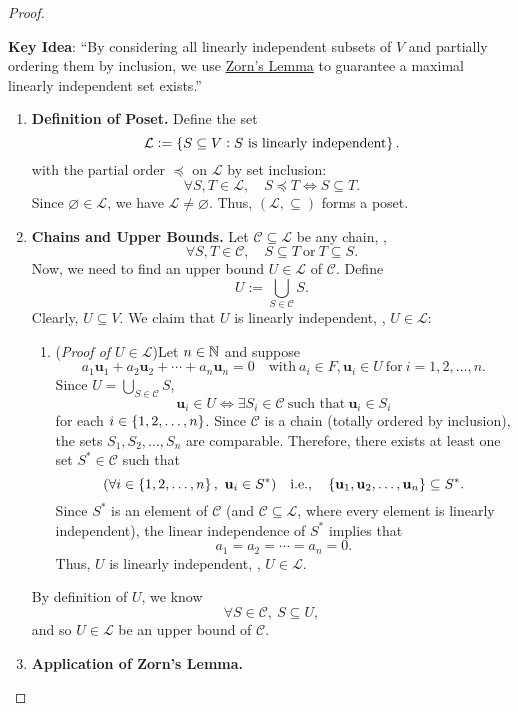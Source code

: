 \documentclass[11pt,openany]{article}
\renewcommand{\vec}[1]{\mathbf{#1}}
\begin{document}
\newpage
{}
\begin{proof}
	\ \begin{flushleft}\color{red}
		\textbf{Key Idea}: ``By considering all linearly independent subsets of \(V\) and partially ordering them by inclusion, we use \underline{Zorn's Lemma} to guarantee a maximal linearly independent set exists.''
	\end{flushleft}
		\begin{enumerate}[Step 1]
				\item \textbf{Definition of Poset.}
				Define the set \[
				\mathcal{L}:=\set{S\subseteq V:\text{$S$ is linearly independent}}.
				\] with the partial order $\preceq$ on $\mathcal{L}$ by set inclusion: \[
				\forall S,T\in\mathcal{L},\quad S\preceq T\iff S\subseteq T.
				\] Since $\varnothing\in\mathcal{L}$, we have $\mathcal{L}\neq\varnothing$. Thus, $(\mathcal{L},\subseteq)$ forms a poset.
				\item \textbf{Chains and Upper Bounds.}
				Let $\mathcal{C}\subseteq\mathcal{L}$ be any chain, \ie, \[
				\forall S,T\in\mathcal{C},\quad S\subseteq T\ \text{or}\ T\subseteq S.
				\] Now, we need to find an upper bound $U\in\mathcal{L}$ of $\mathcal{C}$. Define \[
				U:=\bigcup_{S\in\mathcal{C}}S.
				\] Clearly, $U\subseteq V$. We claim that $U$ is linearly independent, \ie, $U\in\mathcal{L}$:
				\begin{enumerate}
						\item[] (\textit{Proof of $U\in\mathcal{L}$})\quad Let $n\in\mathbb{N}$ and suppose \[
						a_1\vec{u}_1+a_2\vec{u}_2+\cdots+a_n\vec{u}_n=0\quad\text{with}\ a_i\in F, \vec{u}_i\in U\ \text{for}\ i=1,2,\dots,n.
						\] Since $U=\bigcup_{S\in\mathcal{C}}S$, \[
						\vec{u}_i\in U\iff \exists S_i\in\mathcal{C}\ \text{such that}\ \vec{u}_i\in S_i
						\] for each $i\in\set{1,2,\dots,n}$. Since $\mathcal{C}$ is a chain (totally ordered by inclusion), the sets $S_1,S_2,\dots,S_n$ are comparable. Therefore, there exists at least one set $S^*\in\mathcal{C}$ such that \[
						(\forall i\in\set{1,2,\dots,n},\ \vec{u}_i\in S^*)\quad\ie,\quad\set{\vec{u}_1,\vec{u}_2,\dots,\vec{u}_n}\subseteq S^*.
						\] Since $S^*$ is an element of $\mathcal{C}$ (and $\mathcal{C}\subseteq\mathcal{L}$, where every element is linearly independent), the linear independence of $S^*$ implies that \[
						a_1=a_2=\cdots=a_n=0.
						\] Thus, $U$ is linearly independent, \ie, $U\in\mathcal{L}$.
					\end{enumerate}
				By definition of $U$, we know \[
				\forall S\in\mathcal{C},\ S\subseteq U,
				\] and so $U\in\mathcal{L}$ be an upper bound of $\mathcal{C}$.
				\item \textbf{Application of Zorn's Lemma.}
				

\end{enumerate}
\end{proof}
\end{document}
